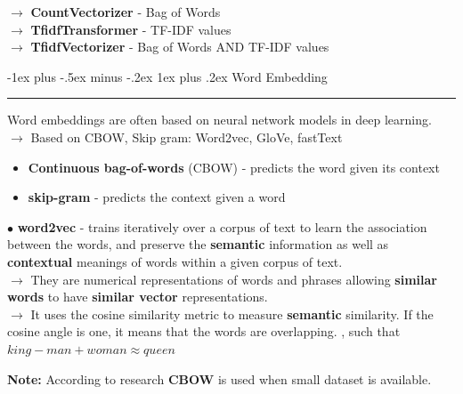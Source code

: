 \documentclass[letterpaper, 10.5pt,landscape]{article}
\makeatletter
\renewcommand{\subsubsection}{\@startsection{subsubsection}{3}{0mm}%
                                {-1ex plus -.5ex minus -.2ex}%
                                {1ex plus .2ex}%
                                {\normalfont\small\bfseries}}
\makeatother
\begin{document}
\begin{multicols*}{3}
\begin{itemize}[label={--},leftmargin=4mm]
\vspace{3pt}
$\rightarrow$ \textbf{CountVectorizer} - Bag of Words \\
$\rightarrow$ \textbf{TfidfTransformer} - TF-IDF values \\
$\rightarrow$ \textbf{TfidfVectorizer} - Bag of Words AND TF-IDF values \\



\end{itemize}








\subsubsection{Word Embedding}  {\color{teal}\hrule height 0.5pt} \smallskip

Word embeddings are often based on neural network models in deep learning. \\



$\rightarrow$ Based on CBOW, Skip gram: Word2vec, GloVe, fastText
\begin{itemize}[label={--},leftmargin=4mm]
\vspace{-3pt}
\item \textbf{Continuous bag-of-words} (CBOW) - predicts the word given its context
\vspace{-3pt}
\item \textbf{skip-gram} - predicts the context given a word
\end{itemize}


$\bullet$ \textbf{word2vec} - trains iteratively over a corpus of text to learn the association between the words, and preserve the \textbf{semantic} information as well as \textbf{contextual} meanings of words within a given corpus of text. \\

$\rightarrow$ They are numerical representations of words and phrases allowing \textbf{similar words} to have \textbf{similar vector} representations.\\


$\rightarrow$ It uses the cosine similarity metric to measure \textbf{semantic} similarity. If the cosine angle is one, it means that the words are overlapping. , such that $king - man + woman \approx queen$


\vspace{3pt}
\textbf{Note:} According to research \textbf{CBOW} is used when small dataset is available.


\end{multicols*}
\end{document}
